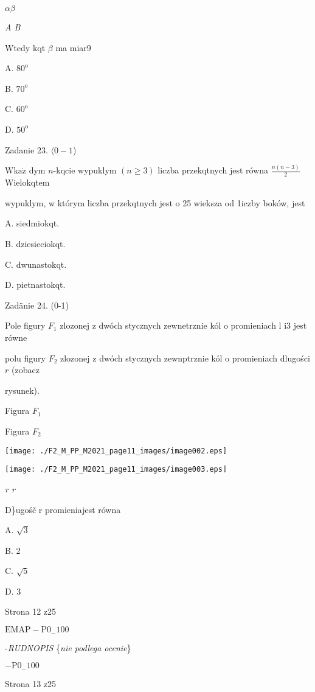 \documentclass[a4paper,12pt]{article}
\begin{document}
$\alpha  \beta$

{\it A  B}

Wtedy kqt $\beta$ ma miar9

A. $80^{\mathrm{o}}$

B. $70^{\mathrm{o}}$

C. $60^{\mathrm{o}}$

D. $50^{\mathrm{o}}$

Zadanie 23. $\langle 0-1$)

$\mathrm{W}\mathrm{k}\mathrm{a}\dot{\mathrm{z}}$ dym $n$-kqcie wypuklym $(n\geq 3)$ liczba przekqtnych jest równa $\displaystyle \frac{n(n-3)}{2}$ Wielokqtem

wypuklym, w którym liczba przekqtnych jest o 25 wieksza od 1iczby boków, jest

A. siedmiokqt.

B. dziesieciokqt.

C. dwunastokqt.

D. pietnastokqt.

Zadänie 24. (0-1)

Pole figury $F_{1}$ zlozonej z dwóch stycznych zewnetrznie kól o promieniach l $\mathrm{i} 3$ jest równe

polu figury $F_{2}$ zlozonej z dwóch stycznych zewnptrznie kól o promieniach dlugości $r$ (zobacz

rysunek).

Figura $F_{1}$

Figura $F_{2}$
\begin{center}
\texttt{[image: ./F2\_M\_PP\_M2021\_page11\_images/image002.eps]}

\texttt{[image: ./F2\_M\_PP\_M2021\_page11\_images/image003.eps]}
\end{center}
{\it r r}

D\}ugośč r promieniajest równa

A. $\sqrt{3}$

B. 2

C. $\sqrt{5}$

D. 3

Strona 12 z25

$\mathrm{E}\mathrm{M}\mathrm{A}\mathrm{P}-\mathrm{P}0_{-}100$





-{\it RUDNOPIS} \{{\it nie podlega ocenie}\}

$-\mathrm{P}0_{-}100$

Strona 13 z25
\end{document}
